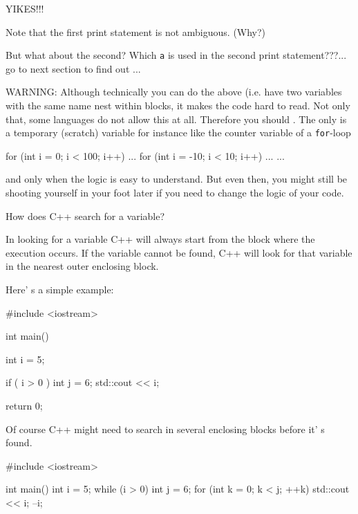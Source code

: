 YIKES!!!

Note that the first print statement is not ambiguous. (Why?)

But what about the second? Which \texttt{a} is used in the second print statement???... go to next section to find out ...

WARNING: Although technically you can do the above (i.e. have two variables with the same name nest within blocks, it makes the code hard to read. Not only that, some languages do not allow this at all. Therefore you should . The only  is a temporary (scratch) variable for instance like the counter variable of a \texttt{for}-loop

\begin{console}
for (int i = 0; i < 100; i++)
{    
     ...
     for (int i = -10; i < 10; i++)
     {    
          ...
     }
     ...
}
\end{console}

and only when the logic is easy to understand. But even then, you might still be shooting yourself in your foot later if you need to change the logic of your code.

How does C++ search for a variable?

In looking for a variable C++ will always start from the block where the execution occurs. If the variable cannot be found, C++ will look for that variable in the nearest outer enclosing block.

Here' s a simple example:

\begin{console}
#include <iostream>

int main()
{    
     int i = 5;

     if ( i > 0 )
     {    
          int j = 6;
          std::cout << i;
     }

     return 0;
}
\end{console}






Of course C++ might need to search in several enclosing blocks before
it' s found.

\begin{console}
#include <iostream>

int main()
{    
     int i = 5;
     while (i > 0)
     {    
          int j = 6;
          for (int k = 0; k < j; ++k)
          {   
               std::cout << i;
               --i;
          }
     }
}
\end{console}


